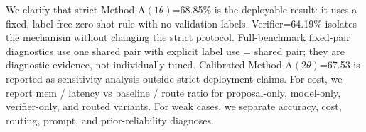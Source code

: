 We clarify that strict Method-A$(1\theta)$=68.85\% is the deployable result: it uses a fixed, label-free zero-shot rule with no validation labels.
Verifier=64.19\% isolates the mechanism without changing the strict protocol.
Full-benchmark fixed-pair diagnostics use one shared pair with explicit label use = shared pair; they are diagnostic evidence, not individually tuned.
Calibrated Method-A$(2\theta)$=67.53 is reported as sensitivity analysis outside strict deployment claims.
For cost, we report mem / latency vs baseline / route ratio for proposal-only, model-only, verifier-only, and routed variants.
For weak cases, we separate accuracy, cost, routing, prompt, and prior-reliability diagnoses.
